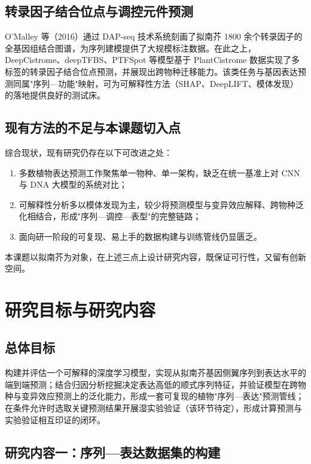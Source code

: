 \documentclass[UTF8,11pt,a4paper]{ctexart}
\begin{document}
\subsection{转录因子结合位点与调控元件预测}
\label{sec:survey-tf}

O'Malley 等（2016）通过 DAP-seq 技术系统刻画了拟南芥 1800 余个转录因子的全基因组结合图谱，为序列建模提供了大规模标注数据\cite{omalley2016}。在此之上，DeepCistrome、deepTFBS、PTFSpot 等模型基于 PlantCistrome 数据实现了多标签的转录因子结合位点预测，并展现出跨物种迁移能力\cite{deepcistrome2022}。该类任务与基因表达预测同属"序列—功能"映射，可为可解释性方法（SHAP、DeepLIFT、模体发现）的落地提供良好的测试床。

\subsection{现有方法的不足与本课题切入点}
\label{sec:survey-gap}

综合现状，现有研究仍存在以下可改进之处：
\begin{enumerate}
\item 多数植物表达预测工作聚焦单一物种、单一架构，缺乏在统一基准上对 CNN 与 DNA 大模型的系统对比；
\item 可解释性分析多以模体发现为主，较少将预测模型与变异效应解释、跨物种泛化相结合，形成"序列—调控—表型"的完整链路；
\item 面向研一阶段的可复现、易上手的数据构建与训练管线仍显匮乏。
\end{enumerate}
本课题以拟南芥为对象，在上述三点上设计研究内容，既保证可行性，又留有创新空间。

\section{研究目标与研究内容}
\label{sec:objective}

\subsection{总体目标}
\label{sec:objective-overall}

构建并评估一个可解释的深度学习模型，实现从拟南芥基因侧翼序列到表达水平的端到端预测；结合归因分析挖掘决定表达高低的顺式序列特征，并验证模型在跨物种与变异效应预测上的泛化能力，形成一套可复现的植物"序列—表达"预测管线；在条件允许时选取关键预测结果开展湿实验验证（该环节待定），形成计算预测与实验验证相互印证的闭环。

\subsection{研究内容一：序列—表达数据集的构建}
\label{sec:objective-data}
\end{document}
